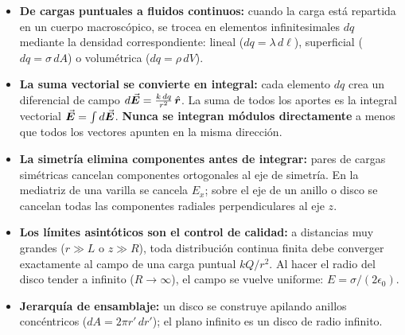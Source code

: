\documentclass[11pt]{article}
\begin{document}
\begin{eClave}
\begin{itemize}[leftmargin=*,itemsep=2pt,topsep=0pt]
  \item \textbf{De cargas puntuales a fluidos continuos:} cuando la carga está repartida en un cuerpo macroscópico, se trocea en elementos infinitesimales $dq$ mediante la densidad correspondiente: lineal ($dq=\lambda\,d\ell$), superficial ($dq=\sigma\,dA$) o volumétrica ($dq=\rho\,dV$).
  \item \textbf{La suma vectorial se convierte en integral:} cada elemento $dq$ crea un diferencial de campo $d\vec{\bm{E}}=\frac{k\,dq}{r^2}\,\hat{\bm{r}}$. La suma de todos los aportes es la integral vectorial $\vec{\bm{E}}=\int d\vec{\bm{E}}$. \textbf{Nunca se integran módulos directamente} a menos que todos los vectores apunten en la misma dirección.
  \item \textbf{La simetría elimina componentes antes de integrar:} pares de cargas simétricas cancelan componentes ortogonales al eje de simetría. En la mediatriz de una varilla se cancela $E_x$; sobre el eje de un anillo o disco se cancelan todas las componentes radiales perpendiculares al eje $z$.
  \item \textbf{Los límites asintóticos son el control de calidad:} a distancias muy grandes ($r\gg L$ o $z\gg R$), toda distribución continua finita debe converger exactamente al campo de una carga puntual $kQ/r^2$. Al hacer el radio del disco tender a infinito ($R\to\infty$), el campo se vuelve uniforme: $E=\sigma/(2\epsilon_0)$.
  \item \textbf{Jerarquía de ensamblaje:} un disco se construye apilando anillos concéntricos ($dA=2\pi r'\,dr'$); el plano infinito es un disco de radio infinito.
\end{itemize}
\end{eClave}
\end{document}
